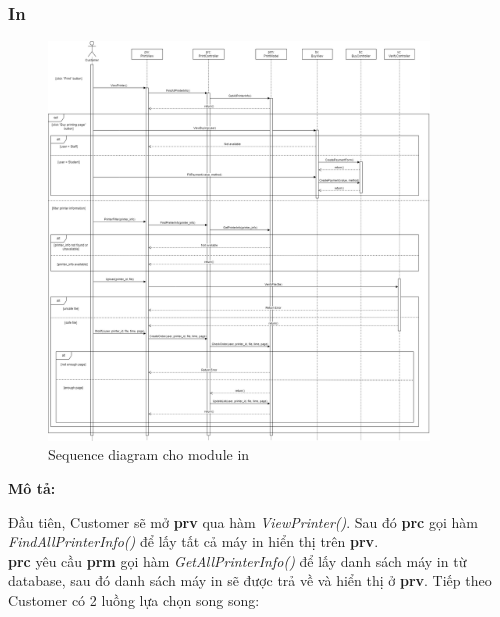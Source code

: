 \subsubsection{In}
\begin{figure}[H]
    \begin{center}
        \includegraphics[width=0.9\textwidth]{Images/System Modelling/Printing_Sequence.png}
        \caption{Sequence diagram cho module in}
    \end{center}
\end{figure}
\textbf{Mô tả: }\par
Đầu tiên, Customer sẽ mở \textbf{prv} qua hàm \textit{ViewPrinter()}. Sau đó \textbf{prc} gọi hàm \textit{FindAllPrinterInfo()} để lấy tất cả máy in hiển thị trên \textbf{prv}. \\
\textbf{prc} yêu cầu \textbf{prm} gọi hàm \textit{GetAllPrinterInfo()} để lấy danh sách máy in từ database, sau đó danh sách máy in sẽ được trả về và hiển thị ở \textbf{prv}.
Tiếp theo Customer có 2 luồng lựa chọn song song:
